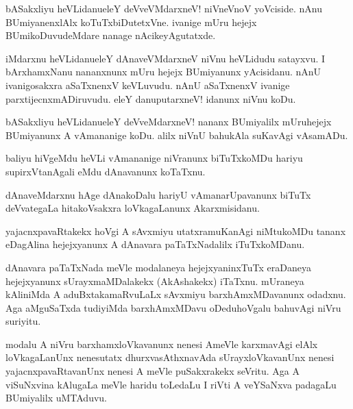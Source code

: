\begin{mng}
bASakxliyu heVLidanu\mdash eleY deVveVMdarxneV! niVneVnoV yoVciside. nAnu BUmiyanenxlAlx koTuTxbiDutetxVne. ivanige mUru hejejx BUmikoDuvudeMdare nanage nAcikeyAgutatxde.
\end{mng}

\begin{mng}
iMdarxnu heVLidanu\mdash eleY dAnaveVMdarxneV niVnu heVLidudu satayxvu. I bArxhamxNanu nananxnunx mUru hejejx BUmiyanunx yAcisidanu. nAnU ivanigosakxra aSaTxnenxV keVLuvudu. nAnU aSaTxnenxV ivanige parxtijecnxmADiruvudu. eleY danuputarxneV! idanunx niVnu koDu.
\end{mng}

\begin{mng}
bASakxliyu heVLidanu\mdash eleY deVveMdarxneV! nananx BUmiyalilx mUruhejejx BUmiyanunx A vAmananige koDu. alilx niVnU bahukAla suKavAgi vAsamADu.
\end{mng}

\begin{mng}
baliyu hiVgeMdu heVLi vAmananige niVranunx biTuTxkoMDu hariyu supirxVtanAgali eMdu dAnavanunx koTaTxnu.
\end{mng}

\begin{mng}
dAnaveMdarxnu hAge dAnakoDalu hariyU vAmanarUpavanunx biTuTx deVvategaLa hitakoVsakxra loVkagaLanunx Akarxmisidanu.
\end{mng}

\begin{mng}
yajacnxpavaRtakekx hoVgi A sAvxmiyu utatxramuKanAgi niMtukoMDu tananx eDagAlina hejejxyanunx A dAnavara paTaTxNadalilx iTuTxkoMDanu.
\end{mng}

\begin{mng}
dAnavara paTaTxNada meVle modalaneya hejejxyaninxTuTx eraDaneya hejejxyanunx sUrayxmaMDalakekx (AkAshakekx) iTaTxnu. mUraneya kAliniMda A aduBxtakamaRvuLaLx sAvxmiyu barxhAmxMDavanunx odadxnu. Aga aMguSaTxda tudiyiMda barxhAmxMDavu oDeduhoVgalu bahuvAgi niVru suriyitu.
\end{mng}

\begin{mng}
modalu A niVru barxhamxloVkavanunx nenesi AmeVle karxmavAgi elAlx loVkagaLanUnx nenesutatx dhurxvasAthxnavAda sUrayxloVkavanUnx nenesi yajacnxpavaRtavanUnx nenesi A meVle puSakxrakekx seVritu. Aga A viSuNxvina kAlugaLa meVle haridu toLedaLu I riVti A veYSaNxva padagaLu BUmiyalilx uMTAduvu.
\end{mng}

